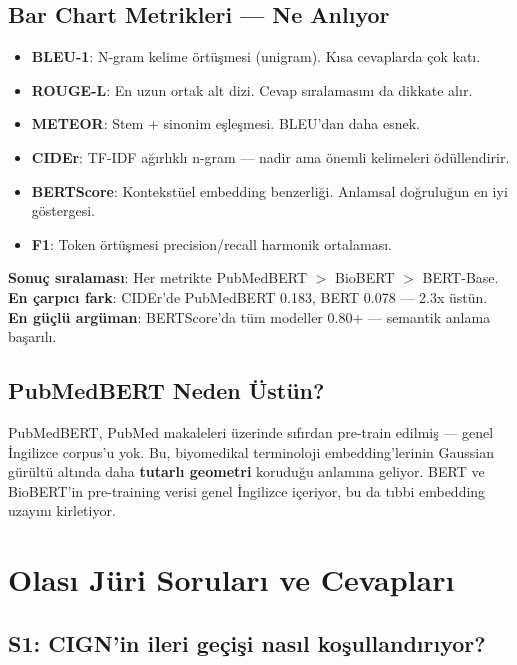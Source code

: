 \documentclass[12pt, a4paper]{article}
\begin{document}
\subsection{Bar Chart Metrikleri — Ne Anlıyor}

\begin{itemize}
  \item \textbf{BLEU-1}: N-gram kelime örtüşmesi (unigram). Kısa cevaplarda çok katı.
  \item \textbf{ROUGE-L}: En uzun ortak alt dizi. Cevap sıralamasını da dikkate alır.
  \item \textbf{METEOR}: Stem + sinonim eşleşmesi. BLEU'dan daha esnek.
  \item \textbf{CIDEr}: TF-IDF ağırlıklı n-gram — nadir ama önemli kelimeleri ödüllendirir.
  \item \textbf{BERTScore}: Kontekstüel embedding benzerliği. Anlamsal doğruluğun en iyi göstergesi.
  \item \textbf{F1}: Token örtüşmesi precision/recall harmonik ortalaması.
\end{itemize}

\textbf{Sonuç sıralaması}: Her metrikte PubMedBERT $>$ BioBERT $>$ BERT-Base. \\
\textbf{En çarpıcı fark}: CIDEr'de PubMedBERT 0.183, BERT 0.078 — 2.3x üstün.\\
\textbf{En güçlü argüman}: BERTScore'da tüm modeller 0.80+ — semantik anlama başarılı.

\subsection{PubMedBERT Neden Üstün?}

PubMedBERT, PubMed makaleleri üzerinde sıfırdan pre-train edilmiş — genel İngilizce corpus'u yok.
Bu, biyomedikal terminoloji embedding'lerinin Gaussian gürültü altında daha \textbf{tutarlı geometri} koruduğu anlamına geliyor.
BERT ve BioBERT'in pre-training verisi genel İngilizce içeriyor, bu da tıbbi embedding uzayını kirletiyor.

\section{Olası Jüri Soruları ve Cevapları}

\subsection*{S1: CIGN'in ileri geçişi nasıl koşullandırıyor?}
\end{document}
